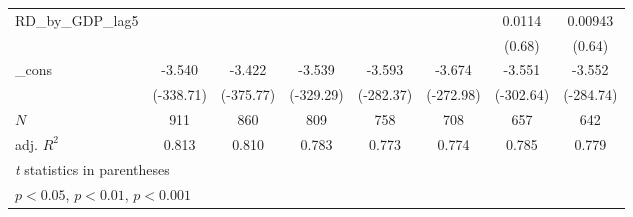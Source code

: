 {\begin{tabular}{l*{7}{c}}
\addlinespace
RD\_by\_GDP\_lag5&                  &                  &                  &                  &                  &   0.0114         &  0.00943         \\
          &                  &                  &                  &                  &                  &   (0.68)         &   (0.64)         \\
\addlinespace
\_cons    &   -3.540\sym{***}&   -3.422\sym{***}&   -3.539\sym{***}&   -3.593\sym{***}&   -3.674\sym{***}&   -3.551\sym{***}&   -3.552\sym{***}\\
          &(-338.71)         &(-375.77)         &(-329.29)         &(-282.37)         &(-272.98)         &(-302.64)         &(-284.74)         \\
\midrule
\(N\)     &      911         &      860         &      809         &      758         &      708         &      657         &      642         \\
adj. \(R^{2}\)&    0.813         &    0.810         &    0.783         &    0.773         &    0.774         &    0.785         &    0.779         \\
\bottomrule
\multicolumn{8}{l}{\footnotesize \textit{t} statistics in parentheses}\\
\multicolumn{8}{l}{\footnotesize \sym{*} \(p<0.05\), \sym{**} \(p<0.01\), \sym{***} \(p<0.001\)}\\
\end{tabular}
}
